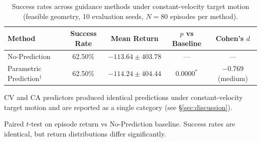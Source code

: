 \begin{table}[t]
\centering
\caption{Success rates across guidance methods under constant-velocity target motion (feasible geometry, 10 evaluation seeds, $N = 80$ episodes per method).}
\label{tab:main_results}
\begin{tabular}{lcccc}
\toprule
Method & Success Rate & Mean Return & $p$ vs Baseline & Cohen's $d$ \\
\midrule
No-Prediction & 62.50\% & $-113.64 \pm 403.78$ & --- & --- \\
Parametric Prediction$^\dagger$ & 62.50\% & $-114.24 \pm 404.44$ & $0.0000^*$ & $-0.769$ (medium) \\
\bottomrule
\end{tabular}
\begin{tablenotes}
\small
\item[$^\dagger$] CV and CA predictors produced identical predictions under 
  constant-velocity target motion and are reported as a single category 
  (see \S\ref{sec:discussion}).
\item * Paired $t$-test on episode return vs No-Prediction baseline.  Success rates 
  are identical, but return distributions differ significantly.
\end{tablenotes}
\end{table}
